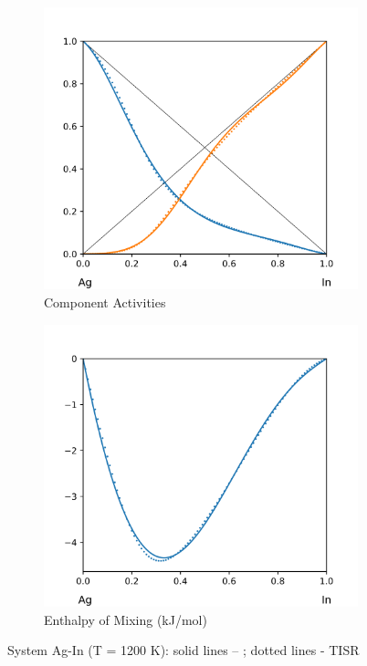 \documentclass[12pt,abstract]{scrartcl}
\begin{document}
\begin{figure}[h]
\centering
\begin{subfigure}{.5\textwidth}
  \centering
  \includegraphics[width=1\linewidth]{Ag-In_Activity}
  \caption{Component Activities}
  \label{fig:Ag-In1}
\end{subfigure}%
\begin{subfigure}{.5\textwidth}
  \centering
  \includegraphics[width=1\linewidth]{Ag-In_Enthalpy}
  \caption{Enthalpy of Mixing (kJ/mol)}
  \label{fig:Ag-In2}
\end{subfigure}
\caption{System Ag-In (T = 1200 K): solid lines -- \cite{Ag-In_Data}; dotted lines - TISR}
\label{fig:Ag-In}
\end{figure}
\end{document}

